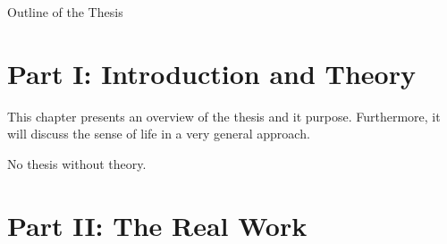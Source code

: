 \newpage

{}

\begin{center}
	\huge{Outline of the Thesis}
\end{center}



\section*{Part I: Introduction and Theory}


\noindent  This chapter presents an overview of the thesis and it purpose. Furthermore, it will discuss the sense of life in a very general approach.


\noindent  No thesis without theory.

\section*{Part II: The Real Work}

